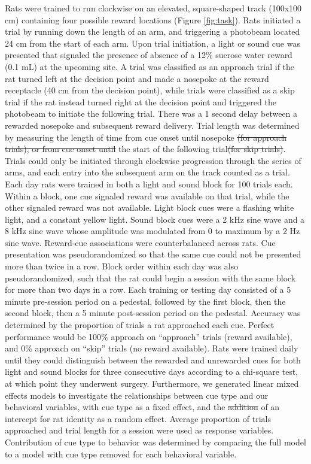 \documentclass[11pt]{article}
\providecommand{\DIFadd}[1]{{\protect\color{blue}\uwave{#1}}} %
\providecommand{\DIFdel}[1]{{\protect\color{red}\sout{#1}}}                      %
\providecommand{\DIFaddbegin}{} %
\providecommand{\DIFaddend}{} %
\providecommand{\DIFdelbegin}{} %
\providecommand{\DIFdelend}{} %
\newcommand{\DIFscaledelfig}{0.5}
\newlength{\DIFdelgraphicswidth} %
\newlength{\DIFdelgraphicsheight} %
\newcommand{\DIFaddincludegraphics}[2][]{{\color{blue}\fbox{\DIFOincludegraphics[#1]{#2}}}} %
\newcommand{\DIFdelincludegraphics}[2][]{%
\sbox{\DIFdelgraphicsbox}{\DIFOincludegraphics[#1]{#2}}%
\settoboxwidth{\DIFdelgraphicswidth}{\DIFdelgraphicsbox} %
\settoboxtotalheight{\DIFdelgraphicsheight}{\DIFdelgraphicsbox} %
\scalebox{\DIFscaledelfig}{%
\parbox[b]{\DIFdelgraphicswidth}{\usebox{\DIFdelgraphicsbox}\\[-\baselineskip] \rule{\DIFdelgraphicswidth}{0em}}\llap{\resizebox{\DIFdelgraphicswidth}{\DIFdelgraphicsheight}{%
\setlength{\unitlength}{\DIFdelgraphicswidth}%
\begin{picture}(1,1)%
\thicklines\linethickness{2pt} %
{\color[rgb]{1,0,0}\put(0,0){\framebox(1,1){}}}%
{\color[rgb]{1,0,0}\put(0,0){\line( 1,1){1}}}%
{\color[rgb]{1,0,0}\put(0,1){\line(1,-1){1}}}%
\end{picture}%
}\hspace*{3pt}}} %
} %
\DeclareRobustCommand{\DIFaddbegin}{\DIFOaddbegin \let\includegraphics\DIFaddincludegraphics} %
\DeclareRobustCommand{\DIFaddend}{\DIFOaddend \let\includegraphics\DIFOincludegraphics} %
\DeclareRobustCommand{\DIFdelbegin}{\DIFOdelbegin \let\includegraphics\DIFdelincludegraphics} %
\DeclareRobustCommand{\DIFdelend}{\DIFOaddend \let\includegraphics\DIFOincludegraphics} %
\begin{document}
Rats were trained to run clockwise on an elevated, square-shaped track (100x100 cm) containing four possible reward locations (Figure \ref{fig:task}). Rats initiated a trial by running down the length of an arm, and triggering a photobeam located 24 cm from the start of each arm. Upon trial initiation, a light or sound cue was presented that signaled the presence of absence of a 12\% sucrose water reward (0.1 mL) at the upcoming site. A trial was classified as an approach trial if the rat turned left at the decision point and made a nosepoke at the reward receptacle (40 cm from the decision point), while trials were classified as a skip trial if the rat instead turned right at the decision point and triggered the photobeam to initiate the following trial. There was a 1 second delay between a rewarded nosepoke and subsequent reward delivery. Trial length was determined by measuring the length of time from cue onset until nosepoke \DIFdelbegin \DIFdel{(for approach trials), or from cue onset until }\DIFdelend \DIFaddbegin \DIFadd{or }\DIFaddend the start of the following trial\DIFdelbegin \DIFdel{(for skip trials)}\DIFdelend . Trials could only be initiated through clockwise progression through the series of arms, and each entry into the subsequent arm on the track counted as a trial. Each day rats were trained in both a light and sound block for 100 trials each. Within a block, one cue signaled reward was available on that trial, while the other signaled reward was not available. Light block cues were a flashing white light, and a constant yellow light. Sound block cues were a 2 kHz sine wave and a 8 kHz sine wave whose amplitude was modulated from 0 to maximum by a 2 Hz sine wave. Reward-cue associations were counterbalanced across rats. Cue presentation was pseudorandomized so that the same cue could not be presented more than twice in a row. Block order within each day was also pseudorandomized, such that the rat could begin a session with the same block for more than two days in a row. Each training or testing day consisted of a 5 minute pre-session period on a pedestal, followed by the first block, then the second block, then a 5 minute post-session period on the pedestal. Accuracy was determined by the proportion of trials a rat approached each cue. Perfect performance would be 100\% approach on “approach” trials (reward available), and 0\% approach on “skip” trials (no reward available). Rats were trained daily until they could distinguish between the rewarded and unrewarded cues for both light and sound blocks for three consecutive days according to a chi-square test, at which point they underwent surgery. Furthermore, we generated linear mixed effects models to investigate the relationships between cue type and our behavioral variables, with cue type \DIFaddbegin \DIFadd{was used }\DIFaddend as a fixed effect, and the \DIFdelbegin \DIFdel{addition }\DIFdelend \DIFaddbegin \DIFadd{addtion }\DIFaddend of an intercept for rat identity as a random effect. Average proportion of trials approached and trial length for a session were used as response variables. Contribution of cue type to behavior was determined by comparing the full model to a model with cue type removed for each behavioral variable. 
\end{document}
